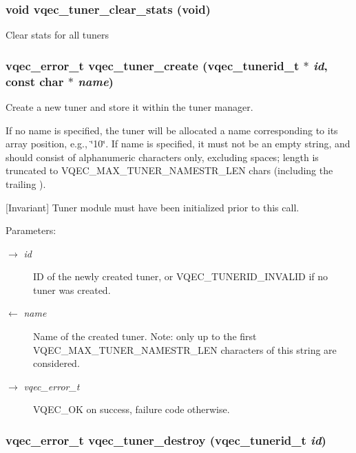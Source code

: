 \subsubsection{\setlength{\rightskip}{0pt plus 5cm}void vqec\_\-tuner\_\-clear\_\-stats (void)}\label{vqec__tuner_8h_2ee0b2887cba3dcc233f2d859590ee1d}


Clear stats for all tuners 
\subsubsection{\setlength{\rightskip}{0pt plus 5cm}vqec\_\-error\_\-t vqec\_\-tuner\_\-create (vqec\_\-tunerid\_\-t $\ast$ {\em id}, const char $\ast$ {\em name})}\label{vqec__tuner_8h_e826b805a1696cdecdc3b6be833b360a}


Create a new tuner and store it within the tuner manager.

If no name is specified, the tuner will be allocated a name corresponding to its array position, e.g., \char`\"{}10\char`\"{}. If name is specified, it must not be an empty string, and should consist of alphanumeric characters only, excluding spaces; length is truncated to VQEC\_\-MAX\_\-TUNER\_\-NAMESTR\_\-LEN chars (including the trailing ).

[Invariant] Tuner module must have been initialized prior to this call. \begin{Desc}
\item[Parameters:]
\begin{description}
\item[\mbox{$\rightarrow$} {\em id}]ID of the newly created tuner, or VQEC\_\-TUNERID\_\-INVALID if no tuner was created. \item[\mbox{$\leftarrow$} {\em name}]Name of the created tuner. Note: only up to the first VQEC\_\-MAX\_\-TUNER\_\-NAMESTR\_\-LEN characters of this string are considered. \item[\mbox{$\rightarrow$} {\em vqec\_\-error\_\-t}]VQEC\_\-OK on success, failure code otherwise. \end{description}
\end{Desc}
\subsubsection{\setlength{\rightskip}{0pt plus 5cm}vqec\_\-error\_\-t vqec\_\-tuner\_\-destroy (vqec\_\-tunerid\_\-t {\em id})}\label{vqec__tuner_8h_ad632acb656a21299365a822605b40e2}


